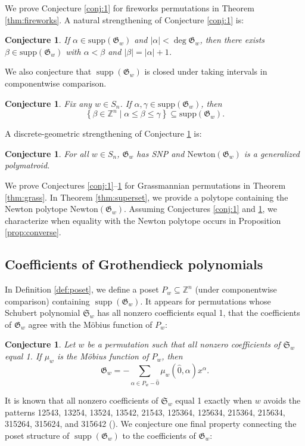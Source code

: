 \documentclass{amsart}
\newtheorem{conjecture}[theorem]{Conjecture}
\theoremstyle{definition}
\theoremstyle{named}
\DeclareMathOperator{\supp}{supp}
\begin{document}
	We prove Conjecture \ref{conj:1} for fireworks permutations in Theorem \ref{thm:fireworks}. A natural strengthening of Conjecture \ref{conj:1} is:	
	\begin{conjecture}
		\label{conj:2}
		If $\alpha\in \mathrm{supp}(\mathfrak{G}_w)$ and $|\alpha|<\deg \mathfrak{G}_w$, then there exists $\beta\in\mathrm{supp}(\mathfrak{G}_w)$ with $\alpha< \beta$ and $|\beta|=|\alpha|+1$.
	\end{conjecture}
	
	We also conjecture that $\supp(\mathfrak{G}_w)$ is closed under taking intervals in componentwise comparison.
	\begin{conjecture}
		\label{conj:3}
		Fix any $w\in S_n$. If $\alpha,\gamma\in\mathrm{supp}(\mathfrak{G}_w)$, then
		\[\left\{\beta\in \mathbb{Z}^n \mid \alpha\leq \beta\leq \gamma \right\} \subseteq \mathrm{supp}(\mathfrak{G}_w).  \]
	\end{conjecture}
	
	A discrete-geometric strengthening of Conjecture \ref{conj:3} is: 
	
	\begin{conjecture}
		\label{conj:4}
		For all $w\in S_n$, $\mathfrak{G}_w$ has SNP and $\mathrm{Newton}(\mathfrak{G}_w)$ is a generalized polymatroid.
	\end{conjecture}
	We prove Conjectures \ref{conj:1}--\ref{conj:4} for Grassmannian permutations in Theorem \ref{thm:grass}. In Theorem \ref{thm:superset}, we provide a polytope containing the Newton polytope $\mathrm{Newton}(\mathfrak{G}_w)$. Assuming Conjectures \ref{conj:1} and \ref{conj:4}, we characterize when equality with the Newton polytope occurs in Proposition \ref{prop:converse}.
	
	\subsection{Coefficients of Grothendieck polynomials} 
	In Definition \ref{def:poset}, we define a poset $P_w\subseteq \mathbb{Z}^n$ (under componentwise comparison) containing $\supp(\mathfrak{G}_w)$. It appears for permutations whose Schubert polynomial $\mathfrak{S}_w$ has all nonzero coefficients equal 1, that the coefficients of $\mathfrak{G}_w$ agree with the M\"obius function of $P_w$:
	
	\begin{conjecture} 
		\label{conj:mobius} 
		Let $w$ be a permutation such that all nonzero coefficients of $\mathfrak{S}_w$ equal 1. If $\mu_w$ is the M\"obius function of $P_w$, then
		\[\mathfrak{G}_w=-\sum_{\alpha\in P_w-\hat{0}}\mu_w(\hat{0}, \alpha)x^{\alpha}.\]
	\end{conjecture}
	It is known that all nonzero coefficients of $\mathfrak{S}_w$ equal 1 exactly when $w$ avoids the patterns 12543, 13254, 13524, 13542, 21543, 125364, 125634, 215364, 215634, 315264, 315624, and 315642 (\cite[Theorem 4.8]{zeroone}). We conjecture one final property connecting the poset structure of $\supp(\mathfrak{G}_w)$ to the coefficients of $\mathfrak{G}_w$:
	
\end{document}
